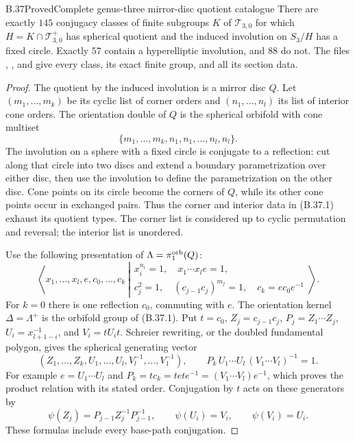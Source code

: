 \begin{claim}{B.37}{Proved}{Complete genus-three mirror-disc quotient catalogue}
There are exactly $145$ conjugacy classes of finite subgroups $K$ of
$\mathcal T_{3,0}$ for which $H=K\cap\mathcal T^+_{3,0}$ has spherical
quotient and the induced involution on $S_3/H$ has a fixed circle.
Exactly $57$ contain a hyperelliptic involution, and $88$ do not.
The files ,
, and
 give every
class, its exact finite group, and all its section data.
\end{claim}
\begin{proof}
The quotient by the induced involution is a mirror disc $Q$.  Let
$(m_1,\ldots,m_k)$ be its cyclic list of corner orders and
$(n_1,\ldots,n_l)$ its list of interior cone orders.  The orientation
double of $Q$ is the spherical orbifold with cone multiset
\[
               \{m_1,\ldots,m_k,n_1,n_1,\ldots,n_l,n_l\}.
                                                        \tag{B.37.1}
\]
The involution on a sphere with a fixed circle is conjugate to a
reflection: cut along that circle into two discs and extend a boundary
parametrization over either disc, then use the involution to define
the parametrization on the other disc.  Cone points on its circle
become the corners of $Q$, while its other cone points occur in
exchanged pairs.  Thus the corner and interior data in (B.37.1)
exhaust its quotient types.  The corner list is considered up to
cyclic permutation and reversal; the interior list is unordered.

Use the following presentation of $\Lambda=\pi_1^{\rm orb}(Q)$:
\[
 \left\langle x_1,\ldots,x_l,e,c_0,\ldots,c_k\ \left|
 \begin{array}{c}
 x_i^{n_i}=1,\quad x_1\cdots x_l e=1,\\
 c_j^2=1,\quad(c_{j-1}c_j)^{m_j}=1,\quad c_k=ec_0e^{-1}
 \end{array}\right.\right\rangle .                    \tag{B.37.2}
\]
For $k=0$ there is one reflection $c_0$, commuting with $e$.
The orientation kernel $\Delta=\Lambda^+$ is the orbifold group
of (B.37.1).  Put $t=c_0$, $Z_j=c_{j-1}c_j$,
$P_j=Z_1\cdots Z_j$, $U_i=x_{l+1-i}^{-1}$, and $V_i=tU_it$.
Schreier rewriting, or the doubled fundamental polygon, gives the
spherical generating vector
\[
 (Z_1,\ldots,Z_k,U_1,\ldots,U_l,V_l^{-1},\ldots,V_1^{-1}),
 \qquad P_k\,U_1\cdots U_l\,(V_1\cdots V_l)^{-1}=1.
                                                        \tag{B.37.3}
\]
For example $e=U_1\cdots U_l$ and
$P_k=t c_k=tet e^{-1}=(V_1\cdots V_l)e^{-1}$, which proves
the product relation with its stated order.  Conjugation by $t$
acts on these generators by
\[
 \psi(Z_j)=P_{j-1}Z_j^{-1}P_{j-1}^{-1},\qquad
 \psi(U_i)=V_i,\qquad\psi(V_i)=U_i.                    \tag{B.37.4}
\]
These formulas include every base-path conjugation.


\end{proof}
